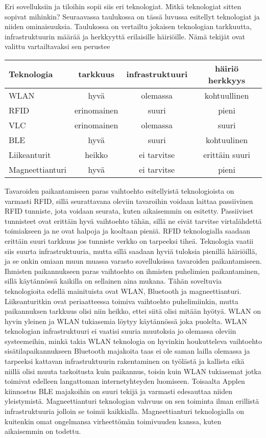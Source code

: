 Eri sovelluksiin ja tiloihin sopii siis eri teknologiat. Mitkä teknologiat sitten sopivat mihinkin?  Seuraavassa taulukossa on tässä luvussa esitellyt teknologiat ja niiden ominaisuuksia. Taulukossa on vertailtu jokaisen teknologian tarkkuutta, infrastruktuurin määrää ja herkkyyttä erilaisille häiriöille. Nämä tekijät ovat valittu vartailtavaksi sen perustee 
\begin{center}
\begin{tabular}{| l || c | c | c| }
\hline
Teknologia & tarkkuus & infrastruktuuri & häiriö herkkyys\\ \hline\hline
WLAN & hyvä & olemassa & kohtuullinen\\ \hline
RFID & erinomainen & suuri & pieni\\ \hline
VLC & erinomainen & olemassa & suuri\\ \hline
BLE & hyvä & suuri & kohtuulinen\\ \hline
Liikeanturit & heikko & ei tarvitse & erittäin suuri\\ \hline
Magneettianturi & hyvä & ei tarvitse & pieni\\
\hline
\end{tabular}
\end{center}
Tavaroiden paikantamiseen paras vaihtoehto esitellyistä teknologioista on varmasti RFID, sillä seurattavana oleviin tavaroihin voidaan laittaa passiivinen RFID tunniste, jota voidaan seurata, kuten aikaisemmin on esitetty. Passiiviset tunnisteet ovat erittäin hyvä vaihtoehto tähän, sillä ne eivät tarvitse virtalähdettä toimiakseen ja ne ovat halpoja ja kooltaan pieniä\cite{F}.
RFID teknologialla saadaan erittäin suuri tarkkuus jos tunniste verkko on tarpeeksi tiheä. Teknologia vaatii siis suurta infrastruktuuria, mutta sillä saadaan hyviä tuloksia pienillä häiriöillä, ja se onkin omiaan muun muassa varasto sovelluksissa tavaroiden paikantamiseen.
Ihmisten paikannukseen paras vaihtoehto on ihmisten puhelimien paikantaminen, sillä käytännössä kaikilla on sellainen aina mukana. Tähän soveltuvia teknologioita edellä mainituista ovat WLAN, Bluetooth ja magneettianturi. Liikeanturitkin ovat periaatteessa toimiva vaihtoehto puhelimiinkin, mutta paikannuksen tarkkuus olisi niin heikko, ettei siitä olisi mitään hyötyä.
WLAN on hyvin yleinen ja WLAN tukiasemia löytyy käytännössä joka puolelta. WLAN teknologian infrastruktuuri ei vaatisi suuria muutoksia jo olemassa oleviin systeemeihin, minkä takia WLAN teknologia on hyvinkin houkutteleva vaihtoehto sisätilapaikannukseen
Bluetooth majakoita taas ei ole saman lailla olemassa ja tarpeeksi kattavan infrastruktuurin rakentaminen on työlästä ja kallista eikä niillä olisi muuta tarkoitusta kuin paikannus, toisin kuin WLAN tukiasemat jotka toimivat edelleen langattoman internetyhteyden luomiseen. Toisaalta Applen kiinnostus BLE majakoihin on suuri tekijä ja varmasti edesauttaa niiden yleistymistä.
Magneettianturi teknologian vahvuus on sen toiminta ilman erillistä infrastruktuuria jolloin se toimii kaikkialla. Magneettianturi teknologialla on kuitenkin omat ongelmansa virheettömän toimivuuden kanssa, kuten aikaisemmin on todettu. 

